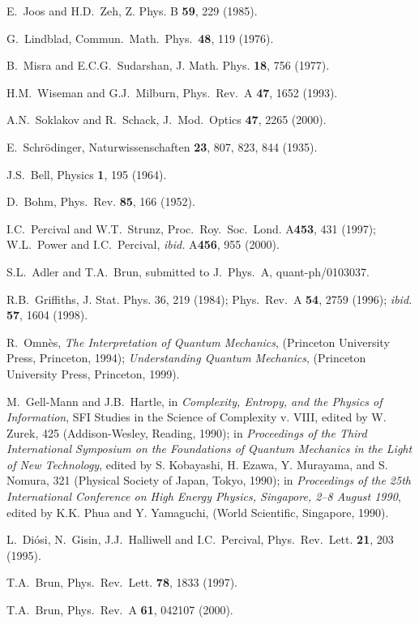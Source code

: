 \begin{thebibliography}{99}
  E.~Joos and H.D.~Zeh, Z. Phys. B {\bf 59}, 229 (1985).

 G.~Lindblad, Commun.~Math.~Phys.~{\bf 48}, 119 (1976).

  B.~Misra and E.C.G.~Sudarshan, J. Math. Phys. {\bf 18},
  756 (1977).

 H.M.~Wiseman and G.J.~Milburn, Phys.~Rev.~A {\bf 47},
1652 (1993).

 A.N.~Soklakov and R.~Schack, J.~Mod.~Optics {\bf 47},
  2265 (2000).

 E.~Schr\"odinger, Naturwissenschaften {\bf 23},
807, 823, 844 (1935).

 J.S.~Bell, Physics {\bf 1}, 195 (1964).

 D.~Bohm, Phys.~Rev. {\bf 85}, 166 (1952).

 I.C.~Percival and W.T.~Strunz,
Proc.~Roy.~Soc.~Lond. A{\bf 453}, 431 (1997);
W.L.~Power and I.C.~Percival, {\it ibid.\/} A{\bf 456}, 955 (2000).

 S.L.~Adler and T.A.~Brun, submitted to J.~Phys.~A,
quant-ph/0103037.

 R.B.~Griffiths, J. Stat. Phys. 36, 219 (1984);
Phys.~Rev.~A {\bf 54}, 2759 (1996); {\it ibid.\/} {\bf 57}, 1604 (1998).

 R.~Omn\`es, {\sl The Interpretation of Quantum Mechanics},
(Princeton University Press, Princeton, 1994);
{\sl Understanding Quantum Mechanics},
(Princeton University Press, Princeton, 1999).

 M.~Gell-Mann and J.B.~Hartle, in {\sl Complexity, Entropy,
and the Physics of Information},
SFI Studies in the Science of Complexity v. VIII,
edited by W. Zurek, 425 (Addison-Wesley, Reading, 1990);
in {\sl Proceedings of the Third International Symposium on the Foundations
of Quantum Mechanics in the Light of New Technology},
edited by S. Kobayashi, H. Ezawa, Y. Murayama, and S. Nomura, 321
(Physical Society of Japan, Tokyo, 1990);
in {\sl Proceedings of the 25th International
Conference on High Energy Physics, Singapore, 2--8 August 1990},
edited by K.K. Phua and Y. Yamaguchi, (World Scientific, Singapore, 1990).

 L.~Di\'osi, N.~Gisin, J.J.~Halliwell and I.C.~Percival,
Phys.~Rev.~Lett. {\bf 21}, 203 (1995).

 T.A.~Brun, Phys.~Rev.~Lett. {\bf 78}, 1833 (1997).

 T.A.~Brun, Phys.~Rev.~A {\bf 61}, 042107 (2000).

\end{thebibliography}

